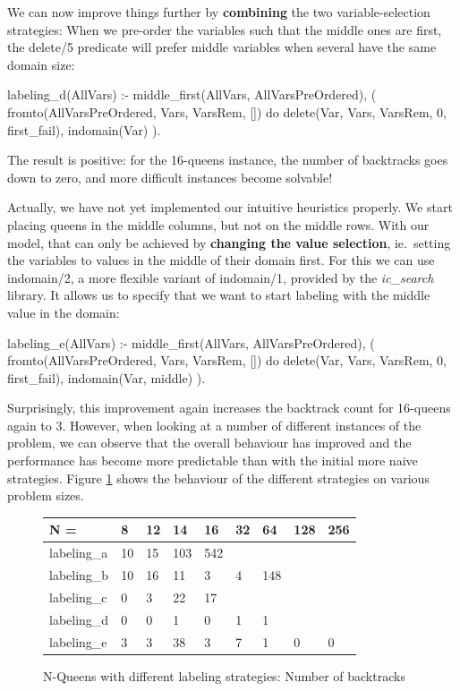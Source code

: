 We can now improve things further by {\bf combining} the two
variable-selection strategies:
When we pre-order the variables such that the middle ones are first,
the delete/5 predicate will prefer middle variables when several
have the same domain size:
\begin{code}
labeling_d(AllVars) :-
        middle_first(AllVars, AllVarsPreOrdered), %
        ( fromto(AllVarsPreOrdered, Vars, VarsRem, []) do
            delete(Var, Vars, VarsRem, 0, first_fail),  %
            indomain(Var)                       %
        ).
\end{code}
The result is positive: for the 16-queens instance,
the number of backtracks goes down to zero,
and more difficult instances become solvable!

Actually, we have not yet implemented our intuitive heuristics properly.
We start placing queens in the middle columns, but not on the middle rows.
With our model, that can only be achieved by {\bf changing the value selection},
ie.\ setting the variables to values in the middle of their domain first.
For this we can use indomain/2, a more flexible variant of indomain/1,
provided by the {\em ic_search} library.
It allows us to specify that we want to start labeling with the middle value
in the domain:
\begin{code}
labeling_e(AllVars) :-
        middle_first(AllVars, AllVarsPreOrdered), %
        ( fromto(AllVarsPreOrdered, Vars, VarsRem, []) do
            delete(Var, Vars, VarsRem, 0, first_fail),  %
            indomain(Var, middle)                 %
        ).
\end{code}
Surprisingly, this improvement again increases the backtrack count for
16-queens again to 3.
However, when looking at a number of different instances of the problem,
we can observe that the overall behaviour has improved and the
performance has become more predictable than with the
initial more naive strategies.
Figure \ref{queensresult} shows the behaviour of the different
strategies on various problem sizes.
\begin{figure}
\begin{center}
\begin{tabular}{l|l|l|l|l|l|l|l|l}
N =     &8  &12 &14 &16 &32 &64 &128    &256\\
\hline
labeling_a  &10 &15 &103    &542    &   &   &   &\\
labeling_b  &10 &16 &11 &3  &4  &148    &   &\\
labeling_c  &0  &3  &22 &17 &   &   &   &\\
labeling_d  &0  &0  &1  &0  &1  &1  &   &\\
labeling_e  &3  &3  &38 &3  &7  &1  &0  &0\\
\end{tabular}
\end{center}
\label{queensresult}
\caption{N-Queens with different labeling strategies: Number of backtracks}
\end{figure}



